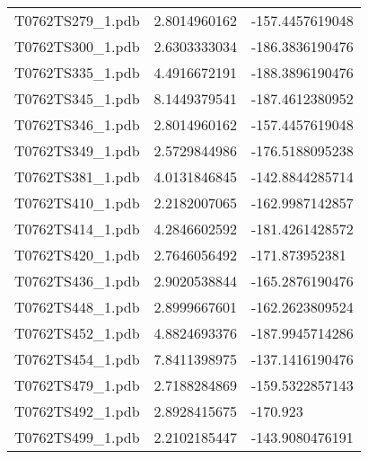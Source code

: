 \begin{table}
\begin{tabular}{lll}
T0762TS279\_1.pdb & 2.8014960162 & -157.4457619048\\
T0762TS300\_1.pdb & 2.6303333034 & -186.3836190476\\
T0762TS335\_1.pdb & 4.4916672191 & -188.3896190476\\
T0762TS345\_1.pdb & 8.1449379541 & -187.4612380952\\
T0762TS346\_1.pdb & 2.8014960162 & -157.4457619048\\
T0762TS349\_1.pdb & 2.5729844986 & -176.5188095238\\
T0762TS381\_1.pdb & 4.0131846845 & -142.8844285714\\
T0762TS410\_1.pdb & 2.2182007065 & -162.9987142857\\
T0762TS414\_1.pdb & 4.2846602592 & -181.4261428572\\
T0762TS420\_1.pdb & 2.7646056492 & -171.873952381\\
T0762TS436\_1.pdb & 2.9020538844 & -165.2876190476\\
T0762TS448\_1.pdb & 2.8999667601 & -162.2623809524\\
T0762TS452\_1.pdb & 4.8824693376 & -187.9945714286\\
T0762TS454\_1.pdb & 7.8411398975 & -137.1416190476\\
T0762TS479\_1.pdb & 2.7188284869 & -159.5322857143\\
T0762TS492\_1.pdb & 2.8928415675 & -170.923\\
T0762TS499\_1.pdb & 2.2102185447 & -143.9080476191
\end{tabular}
\end{table}


